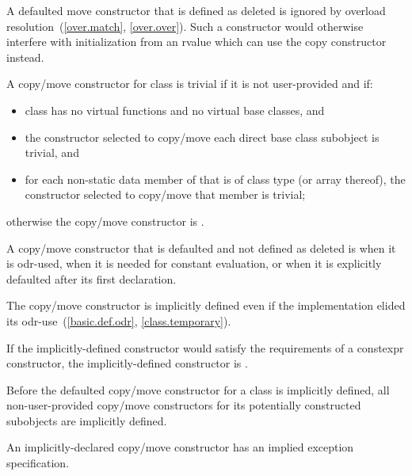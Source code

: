 \begin{note}
A defaulted move constructor that is defined as deleted is ignored by overload
resolution~(\ref{over.match}, \ref{over.over}).
Such a constructor would otherwise interfere with initialization from
an rvalue which can use the copy constructor instead.
\end{note}

\pnum
{}%
%
A copy/move constructor for class
is
trivial
if it is not user-provided and if:
\begin{itemize}
\item
class
has no virtual functions
and no virtual base classes, and

\item
the constructor selected to copy/move each direct base class subobject is trivial, and

\item
for each non-static data member of
that is of class type (or array thereof),
the constructor selected to copy/move that member is trivial;
\end{itemize}

%
otherwise the copy/move constructor is
.

\pnum
{}%
%
A copy/move constructor
that is defaulted and not defined as deleted
is
when it is odr-used,
when it is needed for constant evaluation, or
when it is explicitly defaulted after its first declaration.
\begin{note}
The copy/move constructor is implicitly defined even if the implementation elided
its odr-use~(\ref{basic.def.odr}, \ref{class.temporary}).
\end{note}
If the implicitly-defined constructor would satisfy the requirements of a
constexpr constructor, the implicitly-defined
constructor is .

\pnum
Before the defaulted copy/move constructor for a class is
implicitly defined,
all non-user-provided copy/move constructors for its
potentially constructed subobjects
are implicitly defined.
\begin{note}
An implicitly-declared copy/move constructor has an
implied exception specification.
\end{note}

